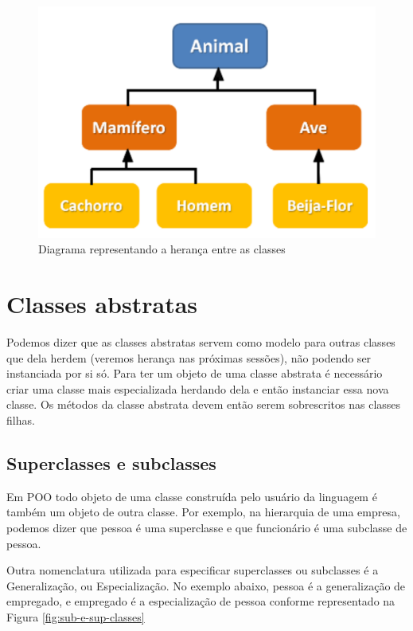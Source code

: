 \begin{figure}[H]
  \centering
  \includegraphics[scale=0.3]{imagens/heranca.png}
  \caption{Diagrama representando a herança entre as classes}
  \label{fig:heranca}
\end{figure}

\section{Classes abstratas}

Podemos dizer que as classes abstratas servem como modelo para outras classes que dela herdem (veremos herança nas próximas sessões), não podendo ser instanciada por si só. Para ter um objeto de uma classe abstrata é necessário criar uma classe mais especializada herdando dela e então instanciar essa nova classe. Os métodos da classe abstrata devem então serem sobrescritos nas classes filhas.


\subsection{Superclasses e subclasses}

Em POO todo objeto de uma classe construída pelo usuário da linguagem é também um objeto de outra classe. Por exemplo, na hierarquia de uma empresa, podemos dizer que pessoa é uma superclasse e que funcionário é uma subclasse de pessoa.

Outra nomenclatura utilizada para especificar superclasses ou subclasses é a Generalização, ou Especialização. No exemplo abaixo, pessoa é a generalização de empregado, e empregado é a especialização de pessoa conforme representado na Figura \ref{fig:sub-e-sup-classes}

